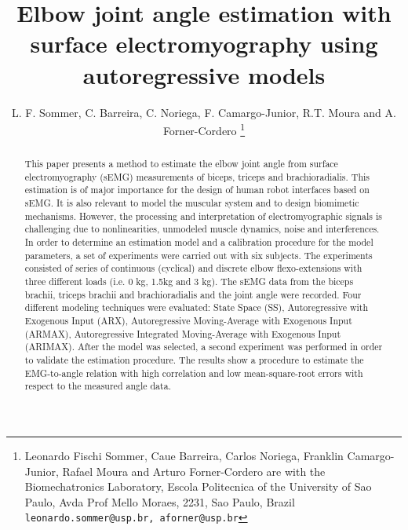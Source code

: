 \documentclass[letterpaper, 10 pt, conference]{ieeeconf}  %
\title{\LARGE \bf Elbow joint angle estimation with surface electromyography using autoregressive models
}
\author{L. F. Sommer, C. Barreira, C. Noriega, F. Camargo-Junior, R.T. Moura and A. Forner-Cordero%
\thanks{Leonardo Fischi Sommer, Caue Barreira, Carlos Noriega, Franklin Camargo-Junior, Rafael Moura and Arturo Forner-Cordero are with the Biomechatronics Laboratory, Escola Politecnica of the University of Sao Paulo, Avda Prof Mello Moraes, 2231, Sao Paulo, Brazil {\tt\small leonardo.sommer@usp.br, aforner@usp.br}}
}
\begin{document}
\maketitle
\thispagestyle{empty}
\pagestyle{empty}


\begin{abstract}


This paper presents a method to estimate the elbow joint angle from surface electromyography (sEMG) measurements of biceps, triceps and brachioradialis. This estimation is of major importance for the design of human robot interfaces based on sEMG. It is also relevant to model the muscular system and to design biomimetic mechanisms. However, the processing and interpretation of electromyographic signals is challenging due to nonlinearities, unmodeled muscle dynamics, noise and interferences. In order to determine an estimation model and a calibration procedure for the model parameters, a set of experiments were carried out with six subjects. The experiments consisted of series of continuous (cyclical) and discrete elbow flexo-extensions with three different loads (i.e. 0 kg, 1.5kg and 3 kg). The sEMG data from the biceps brachii, triceps brachii and brachioradialis and the joint angle were recorded. Four different modeling techniques were evaluated: State Space (SS), Autoregressive with Exogenous Input (ARX), Autoregressive Moving-Average with Exogenous Input (ARMAX), Autoregressive Integrated Moving-Average with Exogenous Input (ARIMAX). After the model was selected, a second experiment was performed in order to validate the estimation procedure. The results show a procedure to estimate the EMG-to-angle relation with high correlation and low mean-square-root errors with respect to the measured angle data.

\end{abstract}
\end{document}
